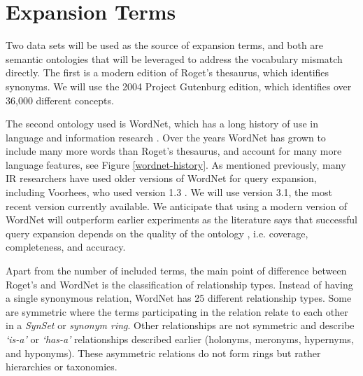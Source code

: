 
















\section{Expansion Terms}
Two data sets will be used as the source of expansion terms, and both are semantic ontologies that will be leveraged to address the vocabulary mismatch directly. The first is a modern edition of Roget's thesaurus, which identifies synonyms. We will use the 2004 Project Gutenburg edition, which identifies over 36,000 different concepts. 


The second ontology used is WordNet, which has a long history of use in language and information research \cite{fellbaum2010wordnet}. Over the years WordNet has grown to include many more words than Roget's thesaurus, and account for many more language features, see Figure \ref{wordnet-history}. As mentioned previously, many IR researchers have used older versions of WordNet for query expansion, including Voorhees, who used version 1.3 \cite{Voorhees:1994:QEU:188490.188508}. We will use version 3.1, the most recent version currently available. We anticipate that using a modern version of WordNet will outperform earlier experiments as the literature says that successful query expansion depends on the quality of the ontology \cite{kim1990model, jones1993thesaurus}, i.e. coverage, completeness, and accuracy.

Apart from the number of included terms, the main point of difference between Roget's and WordNet is the classification of relationship types. Instead of having a single synonymous relation, WordNet has 25 different relationship types. Some are symmetric where the terms participating in the relation relate to each other in a \textit{SynSet} or \textit{synonym ring}. Other relationships are not symmetric and describe \textit{`is-a'} or \textit{`has-a'} relationships described earlier (holonyms, meronyms, hypernyms, and hyponyms). These asymmetric relations do not form rings but rather hierarchies or taxonomies.

